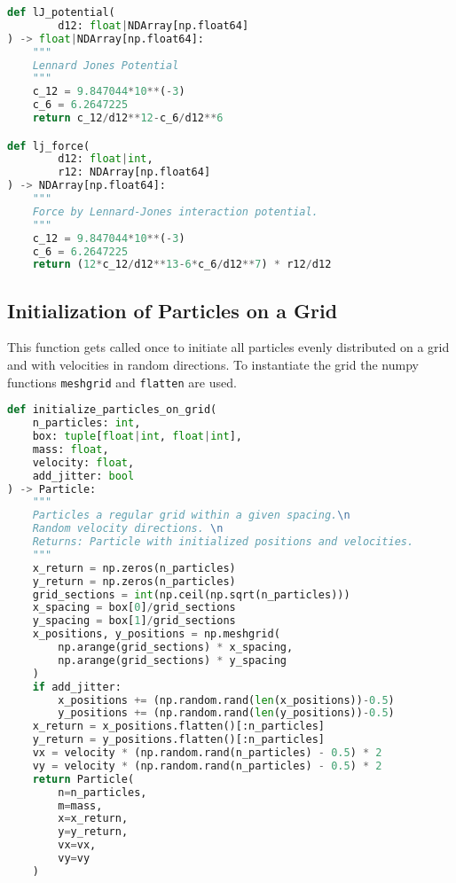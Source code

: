 \documentclass{article}
\begin{document}
\begin{lstlisting}[language=Python, caption={Interaction potential and force}]
def lJ_potential(
        d12: float|NDArray[np.float64]
) -> float|NDArray[np.float64]:
    """
    Lennard Jones Potential
    """
    c_12 = 9.847044*10**(-3)  
    c_6 = 6.2647225           
    return c_12/d12**12-c_6/d12**6

def lj_force(
        d12: float|int,
        r12: NDArray[np.float64]
) -> NDArray[np.float64]:
    """
    Force by Lennard-Jones interaction potential.
    """
    c_12 = 9.847044*10**(-3)  
    c_6 = 6.2647225           
    return (12*c_12/d12**13-6*c_6/d12**7) * r12/d12
\end{lstlisting}

\subsection{Initialization of Particles on a Grid}%
This function gets called once to initiate all particles evenly distributed on a grid and with velocities in random directions. To instantiate the grid the numpy functions \texttt{meshgrid} and \texttt{flatten} are used. 
\begin{lstlisting}[language=Python, caption=Particle Initialization on a Grid]
def initialize_particles_on_grid(
    n_particles: int, 
    box: tuple[float|int, float|int], 
    mass: float, 
    velocity: float,
    add_jitter: bool
) -> Particle:
    """
    Particles a regular grid within a given spacing.\n
    Random velocity directions. \n
    Returns: Particle with initialized positions and velocities. 
    """
    x_return = np.zeros(n_particles)
    y_return = np.zeros(n_particles)
    grid_sections = int(np.ceil(np.sqrt(n_particles))) 
    x_spacing = box[0]/grid_sections 
    y_spacing = box[1]/grid_sections
    x_positions, y_positions = np.meshgrid(
        np.arange(grid_sections) * x_spacing, 
        np.arange(grid_sections) * y_spacing
    )
    if add_jitter:
        x_positions += (np.random.rand(len(x_positions))-0.5)
        y_positions += (np.random.rand(len(y_positions))-0.5)
    x_return = x_positions.flatten()[:n_particles]
    y_return = y_positions.flatten()[:n_particles]
    vx = velocity * (np.random.rand(n_particles) - 0.5) * 2
    vy = velocity * (np.random.rand(n_particles) - 0.5) * 2
    return Particle(
        n=n_particles,
        m=mass,
        x=x_return,
        y=y_return,
        vx=vx,
        vy=vy
    )
\end{lstlisting}
\end{document}
